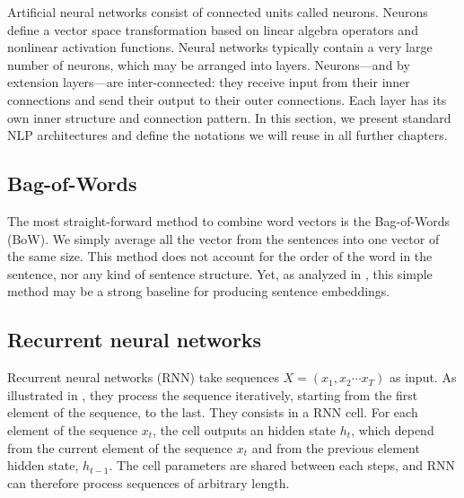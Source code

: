 Artificial neural networks consist of connected units called neurons. Neurons define a vector space transformation based on linear algebra operators and nonlinear activation functions. Neural networks typically contain a very large number of neurons, which may be arranged into layers. Neurons—and by extension layers—are inter-connected: they receive input from their inner connections and send their output to their outer connections. Each layer has its own inner structure and connection pattern. In this section, we present standard NLP architectures and define the notations we will reuse in all further chapters.




\subsection{Bag-of-Words}

The most straight-forward method to combine word vectors is the Bag-of-Words (BoW). We simply average all the vector from the sentences into one vector of the same size. This method does not account for the order of the word in the sentence, nor any kind of sentence structure. Yet, as analyzed in \textcite{arora_17}, this simple method may be a strong baseline for producing sentence embeddings.

\subsection{Recurrent neural networks}

Recurrent neural networks (RNN) \parencite{hochreiter_97, cho_14} take sequences $X = (x_1, x_2 \cdots x_T)$ as input. As illustrated in , they process the sequence iteratively, starting from the first element of the sequence, to the last. They consists in a RNN cell. For each element of the sequence $x_t$, the cell outputs an hidden state $h_t$, which depend from the current element of the sequence $x_t$ and from the previous element hidden state, $h_{t-1}$. The cell parameters are shared between each steps, and RNN can therefore process sequences of arbitrary length.


